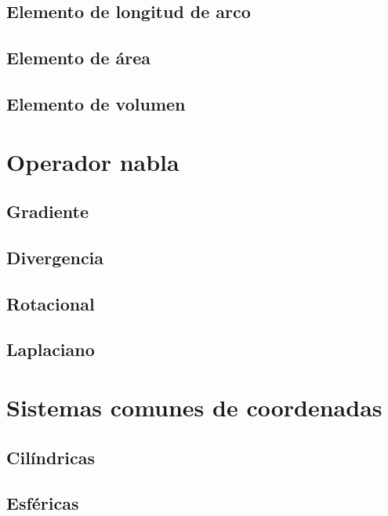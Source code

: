 \documentclass[12pt, fleqn]{report}                             %
\theoremstyle{break}                                            %
\begin{document}
            \subsection{Elemento de longitud de arco}
            
            \subsection{Elemento de área}
            
            \subsection{Elemento de volumen}
            
        \section{Operador nabla}
        
            \subsection{Gradiente}
            
            \subsection{Divergencia}
            
            \subsection{Rotacional}
            
            \subsection{Laplaciano}
            
        \section{Sistemas comunes de coordenadas}
        
            \subsection{Cilíndricas}
            
            \subsection{Esféricas}
            
\end{document}
